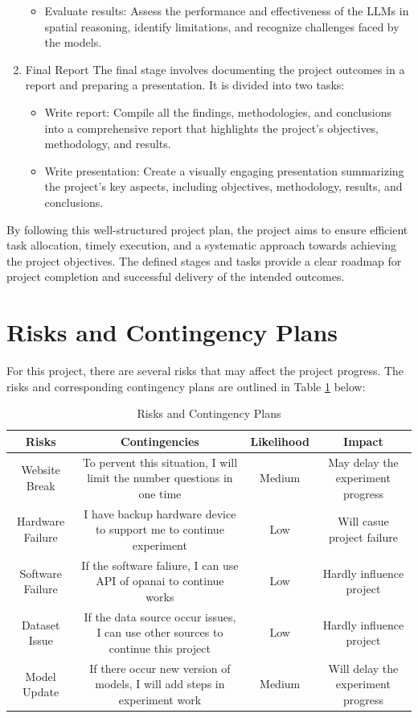 \documentclass[journal,10pt]{IEEEtran}
\begin{document}
\begin{enumerate}
\begin{itemize}
        \item Evaluate results: Assess the performance and effectiveness of the LLMs in spatial reasoning, identify limitations, and recognize challenges faced by the models.
    \end{itemize}
    \item Final Report
    \subitem The final stage involves documenting the project outcomes in a report and preparing a presentation. It is divided into two tasks:
    \begin{itemize}
        \item Write report: Compile all the findings, methodologies, and conclusions into a comprehensive report that highlights the project's objectives, methodology, and results.
        \item Write presentation: Create a visually engaging presentation summarizing the project's key aspects, including objectives, methodology, results, and conclusions.
    \end{itemize}
\end{enumerate}

By following this well-structured project plan, the project aims to ensure efficient task allocation, timely execution, and a systematic approach towards achieving the project objectives. The defined stages and tasks provide a clear roadmap for project completion and successful delivery of the intended outcomes.

\section{Risks and Contingency Plans}
For this project, there are several risks that may affect the project progress. The risks and corresponding contingency plans are outlined in Table \ref{tab:risks} below:
\begin{table}[htbp]
    \centering
    \caption{Risks and Contingency Plans}
    \begin{tabular}{@{}cccc@{}}
    \toprule
    Risks            & Contingencies                                                      & Likelihood & Impact                     \\ \midrule
Website Break & To pervent this situation, I will limit the number questions in one time          & Medium & May delay the experiment progress  \\
Hardware Failure & I have backup hardware device to support me to continue experiment & Low        & Will casue project failure \\
Software Failure & If the software faliure, I can use API of opanai to continue works & Low        & Hardly influence project   \\
Dataset Issue & If the data source occur issues, I can use other sources to continue this project & Low    & Hardly influence project           \\
Model Update  & If there occur new version of models, I will add steps in experiment work         & Medium & Will delay the experiment progress \\ \bottomrule
    \end{tabular}
    \label{tab:risks}
\end{table}




\end{document}
